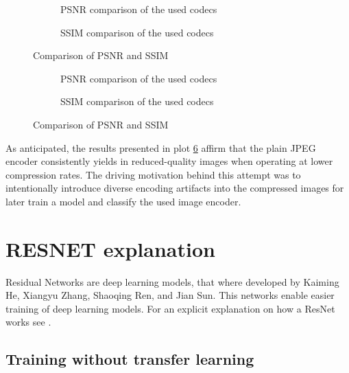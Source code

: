 \begin{figure}[h!]
    \centering
      \begin{subfigure}{0.49\textwidth}
        \resizebox{\textwidth}{!}{}
          \caption{PSNR comparison of the used codecs}
          \label{fig: psnr_comparison}
      \end{subfigure}
      \hfill
      \begin{subfigure}{0.49\textwidth}
        \resizebox{\textwidth}{!}{}
          \caption{SSIM comparison of the used codecs}
          \label{fig:CI}
      \end{subfigure}
\caption{
\label{fig: comparison}%
Comparison of PSNR and SSIM}
\end{figure}

\begin{figure}[h!]
    \centering
      \begin{subfigure}{0.49\textwidth}
        \resizebox{\textwidth}{!}{}
          \caption{PSNR comparison of the used codecs}
          \label{fig: psnr_comparison}
      \end{subfigure}
      \hfill
      \begin{subfigure}{0.49\textwidth}
        \resizebox{\textwidth}{!}{}
          \caption{SSIM comparison of the used codecs}
          \label{fig:CI}
      \end{subfigure}
\caption{
\label{fig: comparison}%
Comparison of PSNR and SSIM}
\end{figure}

\noindent
As anticipated, the results presented in plot \ref{fig: comparison} affirm that the plain JPEG encoder consistently yields in reduced-quality images when operating at lower compression rates.
The driving motivation behind this attempt was to intentionally introduce diverse encoding artifacts into the compressed images for later train a model and classify the used image encoder.
\newpage

\section{RESNET explanation}
Residual Networks are deep learning models, that where developed by Kaiming He, Xiangyu Zhang, Shaoqing Ren, and Jian Sun. This networks enable easier training of deep learning models. For an explicit explanation on how a ResNet works see \cite{he2015deep}.

\subsection{Training without transfer learning}

